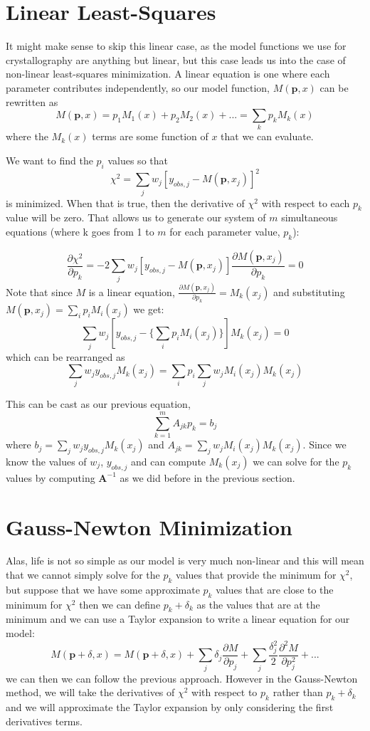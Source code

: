 \section{Linear Least-Squares}
It might make sense to skip this linear case, as the model functions we use for crystallography are anything but linear, but this case leads us into the case of non-linear least-squares minimization. A linear equation is one where each parameter contributes independently, so our model function, $M(\mathbf{p},x)$ can be rewritten as 
$$M(\mathbf{p},x) = p_1 M_1(x) + p_2 M_2(x) + ... = \sum_k p_k M_k(x)$$
where the $M_k(x)$ terms are some function of $x$ that we can evaluate. 

We want to find the $p_i$ values so that 
$$\chi^2 = \sum_j w_j[y_{obs,j}-M(\mathbf{p},x_j)]^2$$
is minimized. When that is true, then the derivative of $\chi^2$ with respect to each  $p_k$ value will be zero. That allows us to generate our system of $m$ simultaneous equations (where k goes from 1 to $m$ for each parameter value, $p_k$):

$$\frac{\partial\chi^2}{\partial p_k} = -2\sum_j w_j[y_{obs,j}-M(\mathbf{p},x_j)]\frac{\partial M(\mathbf{p},x_j)}{\partial p_k} = 0$$
Note that since $M$ is a linear equation, $\frac{\partial M(\mathbf{p},x_j)}{\partial p_k} = M_k(x_j) $ and substituting $M(\mathbf{p},x_j) = \sum_i p_i M_i(x_j)$ we get:
$$\sum_j w_j[y_{obs,j}-\{\sum_i p_i M_i(x_j)\}]M_k(x_j)  = 0$$
which can be rearranged as 
$$\sum_j w_jy_{obs,j}M_k(x_j) = \sum_i p_i \sum_j w_j  M_i(x_j) M_k(x_j) $$

This can be cast as our previous equation,
$$\sum_{k=1}^m A_{jk} p_k = b_j$$
where $b_j = \sum_j w_jy_{obs,j}M_k(x_j) $ and $A_{jk} = \sum_j w_j  M_i(x_j) M_k(x_j)$. Since we know the values of $w_j$, $y_{obs,j}$ and can compute $M_k(x_j)$ we can solve for the $p_k$ values by computing $\mathbf{A}^{-1}$ as we did before in the previous section. 

\section{Gauss-Newton Minimization}
Alas, life is not so simple as our model is very much non-linear and this will mean that we cannot simply solve for the  $p_k$ values that provide the minimum for $\chi^2$, but suppose that we have some approximate $p_k$ values that are close to the minimum for $\chi^2$ then we can define $p_k + \delta_k$ as the values that are at the minimum and we can use a Taylor expansion to write a linear equation for our model:
$$M(\mathbf{p}+\delta,x) = M(\mathbf{p}+\delta,x) + 
\sum_j \delta_j  \frac{\partial M}{\partial p_j} +
\sum_j \frac{\delta_j^2}{2}  \frac{\partial^2 M}{\partial p_j^2}
+ ...
$$
we can then we can follow the previous approach. However in the Gauss-Newton method, we will take the derivatives of $\chi^2$ with respect to $p_k$ rather than $p_k + \delta_k$  and we will approximate the Taylor expansion by only considering the first derivatives terms. 

